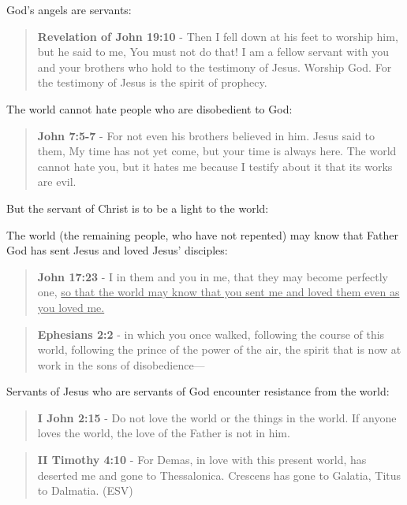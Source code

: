 \documentclass[11pt]{article}
\begin{document}
God's angels are servants:

\begin{quote}
\textbf{Revelation of John 19:10} - Then I fell down at his feet to worship him, but he said to me, You must not do that! I am a fellow servant with you and your brothers who hold to the testimony of Jesus. Worship God. For the testimony of Jesus is the spirit of prophecy.
\end{quote}

The world cannot hate people who are disobedient to God:

\begin{quote}
\textbf{John 7:5-7} - For not even his brothers believed in him. Jesus said to them, My time has not yet come, but your time is always here. The world cannot hate you, but it hates me because I testify about it that its works are evil.
\end{quote}

But the servant of Christ is to be a light to the world:

The world (the remaining people, who have not repented) may know that Father God has sent Jesus and loved Jesus' disciples:

\begin{quote}
\textbf{John 17:23} - I in them and you in me, that they may become perfectly one, \uline{so that the world may know that you sent me and loved them even as you loved me.}
\end{quote}

\begin{quote}
\textbf{Ephesians 2:2} - in which you once walked, following the course of this world, following the prince of the power of the air, the spirit that is now at work in the sons of disobedience—
\end{quote}

Servants of Jesus who are servants of God encounter resistance from the world:

\begin{quote}
\textbf{I John 2:15} - Do not love the world or the things in the world. If anyone loves the world, the love of the Father is not in him.
\end{quote}

\begin{quote}
\textbf{II Timothy 4:10} - For Demas, in love with this present world, has deserted me and gone to Thessalonica. Crescens has gone to Galatia, Titus to Dalmatia. (ESV)
\end{quote}
\end{document}
